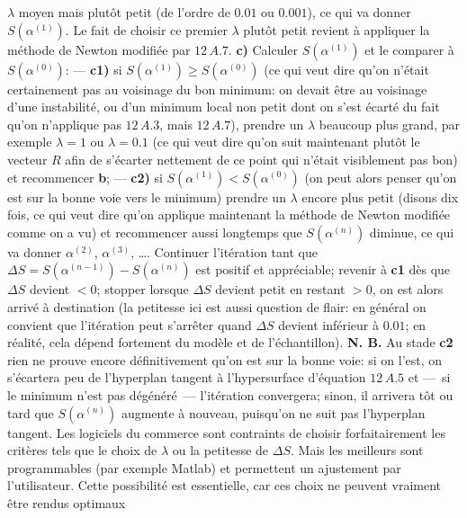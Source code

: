 $\lambda$ moyen mais plut\^ot petit (de l'ordre de $0.01$ ou $0.001$), 
ce qui va donner $S(\alpha^{(1)})$. Le fait de choisir ce premier 
$\lambda$ plut\^ot petit revient \`a appliquer la m\'ethode de Newton 
modifi\'ee par $12\, A.7$. 
\smallskip 
{\bf c)} Calculer $S(\alpha^{(1)})$ et le comparer \`a $S(\alpha^{(0)})$: 
\smallskip 
\leftskip=12pt 
--- {\bf c1)} si $S(\alpha^{(1)}) \geq S(\alpha^{(0)})$ (ce qui veut dire 
qu'on n'\'etait certainement pas au voisinage du bon minimum: on 
devait \^etre au voisinage d'une instabilit\'e, ou d'un minimum local 
non petit dont on s'est \'ecart\'e du fait qu'on n'applique pas $12\, 
A.3$, mais $12\, A.7$), prendre un $\lambda$ beaucoup plus grand, 
par exemple $\lambda = 1$ ou $\lambda = 0.1$ (ce qui veut dire qu'on 
suit maintenant plut\^ot le vecteur $R$ afin de s'\'ecarter nettement
de ce point qui n'\'etait visiblement pas bon) et recommencer {\bf b}; 
\smallskip 
--- {\bf c2)} si $S(\alpha^{(1)}) < S(\alpha^{(0)})$ (on peut alors penser
qu'on est sur la bonne voie vers le minimum) prendre un $\lambda$ 
encore plus petit (disons dix fois, ce qui veut dire qu'on applique 
maintenant la m\'ethode de Newton modifi\'ee comme on a vu) et 
recommencer aussi longtemps que $S(\alpha^{(n)})$ diminue, ce qui va 
donner $\alpha^{(2)}$, $\alpha^{(3)}$, \dots. Continuer l'it\'eration tant 
que $\Delta S = S(\alpha^{(n-1)}) - S(\alpha^{(n)})$ est positif et 
appr\'eciable; revenir \`a {\bf c1} d\`es que $\Delta S$ devient $< 0$; 
stopper lorsque $\Delta S$ devient petit en restant $> 0$, on est alors
arriv\'e \`a destination (la petitesse ici est aussi question de flair: 
en g\'en\'eral on convient que l'it\'eration peut s'arr\^eter quand 
$\Delta S$ devient inf\'erieur \`a $0.01$; en r\'ealit\'e, cela d\'epend 
fortement du mod\`ele et de l'\'echantillon). 
\medskip 
\leftskip=0pt 
{\bf N. B.} Au stade {\bf c2} rien ne prouve encore d\'efinitivement 
qu'on est sur la bonne voie: si on l'est, on s'\'ecartera peu de
l'hyperplan tangent \`a l'hypersurface d'\'equation $12\, A.5$ et
---~si le minimum n'est pas d\'eg\'en\'er\'e~--- l'it\'eration convergera; 
sinon, il arrivera t\^ot ou tard que $S(\alpha^{(n)})$ augmente \`a nouveau, 
puisqu'on ne suit pas l'hyperplan tangent. 
\medskip 
Les logiciels du commerce sont contraints de choisir forfaitairement 
les crit\`eres tels que le choix de $\lambda$ ou la petitesse de $\Delta 
S$. Mais les meilleurs sont programmables (par exemple Matlab) et 
permettent un ajustement par l'utilisateur.  Cette possibilit\'e est 
essentielle, car ces choix ne peuvent vraiment \^etre rendus optimaux 
